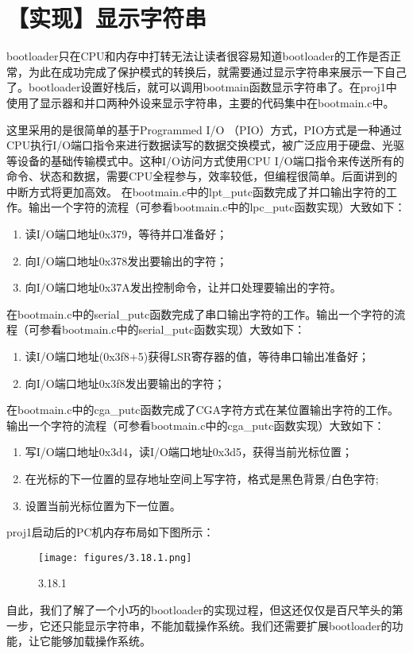 \section{【实现】显示字符串}\label{ux5b9eux73b0ux663eux793aux5b57ux7b26ux4e32}

bootloader只在CPU和内存中打转无法让读者很容易知道bootloader的工作是否正常，为此在成功完成了保护模式的转换后，就需要通过显示字符串来展示一下自己了。bootloader设置好栈后，就可以调用bootmain函数显示字符串了。在proj1中使用了显示器和并口两种外设来显示字符串，主要的代码集中在bootmain.c中。

这里采用的是很简单的基于Programmed I/O
（PIO）方式，PIO方式是一种通过CPU执行I/O端口指令来进行数据读写的数据交换模式，被广泛应用于硬盘、光驱等设备的基础传输模式中。这种I/O访问方式使用CPU
I/O端口指令来传送所有的命令、状态和数据，需要CPU全程参与，效率较低，但编程很简单。后面讲到的中断方式将更加高效。
在bootmain.c中的lpt\_putc函数完成了并口输出字符的工作。输出一个字符的流程（可参看bootmain.c中的lpc\_putc函数实现）大致如下：

\begin{enumerate}
\def\labelenumi{\arabic{enumi}.}
\tightlist
\item
  读I/O端口地址0x379，等待并口准备好；
\item
  向I/O端口地址0x378发出要输出的字符；
\item
  向I/O端口地址0x37A发出控制命令，让并口处理要输出的字符。
\end{enumerate}

在bootmain.c中的serial\_putc函数完成了串口输出字符的工作。输出一个字符的流程（可参看bootmain.c中的serial\_putc函数实现）大致如下：

\begin{enumerate}
\def\labelenumi{\arabic{enumi}.}
\tightlist
\item
  读I/O端口地址(0x3f8+5)获得LSR寄存器的值，等待串口输出准备好；
\item
  向I/O端口地址0x3f8发出要输出的字符；
\end{enumerate}

在bootmain.c中的cga\_putc函数完成了CGA字符方式在某位置输出字符的工作。输出一个字符的流程（可参看bootmain.c中的cga\_putc函数实现）大致如下：

\begin{enumerate}
\def\labelenumi{\arabic{enumi}.}
\tightlist
\item
  写I/O端口地址0x3d4，读I/O端口地址0x3d5，获得当前光标位置；
\item
  在光标的下一位置的显存地址空间上写字符，格式是黑色背景/白色字符;
\item
  设置当前光标位置为下一位置。
\end{enumerate}

proj1启动后的PC机内存布局如下图所示：

\begin{figure}[htbp]
\centering
\texttt{[image: figures/3.18.1.png]}
\caption{3.18.1}
\end{figure}

自此，我们了解了一个小巧的bootloader的实现过程，但这还仅仅是百尺竿头的第一步，它还只能显示字符串，不能加载操作系统。我们还需要扩展bootloader的功能，让它能够加载操作系统。

